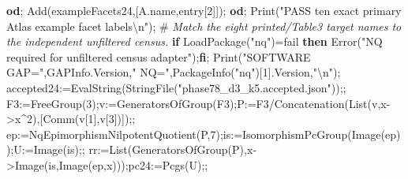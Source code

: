 \documentclass[
  10pt,
  letterpaper,
]{article}
\newenvironment{Shaded}{}{}
\newcommand{\BuiltInTok}[1]{\textcolor[rgb]{0.00,0.50,0.00}{#1}}
\newcommand{\CommentTok}[1]{\textcolor[rgb]{0.38,0.63,0.69}{\textit{#1}}}
\newcommand{\ConstantTok}[1]{\textcolor[rgb]{0.53,0.00,0.00}{#1}}
\newcommand{\ControlFlowTok}[1]{\textcolor[rgb]{0.00,0.44,0.13}{\textbf{#1}}}
\newcommand{\FloatTok}[1]{\textcolor[rgb]{0.25,0.63,0.44}{#1}}
\newcommand{\NormalTok}[1]{#1}
\newcommand{\OperatorTok}[1]{\textcolor[rgb]{0.40,0.40,0.40}{#1}}
\newcommand{\StringTok}[1]{\textcolor[rgb]{0.25,0.44,0.63}{#1}}
\newcommand{\VariableTok}[1]{\textcolor[rgb]{0.10,0.09,0.49}{#1}}
\begin{document}
\begin{Shaded}
\begin{Highlighting}[]
 \ControlFlowTok{od}\OperatorTok{;}
 \BuiltInTok{Add}\NormalTok{(}\VariableTok{exampleFacets24}\OperatorTok{,}\NormalTok{[}\VariableTok{A}\NormalTok{.}\VariableTok{name}\OperatorTok{,}\VariableTok{entry}\NormalTok{[}\FloatTok{2}\NormalTok{]])}\OperatorTok{;}
\ControlFlowTok{od}\OperatorTok{;}
\BuiltInTok{Print}\NormalTok{(}\StringTok{"PASS ten exact primary Atlas example facet labels\textbackslash{}n"}\NormalTok{)}\OperatorTok{;}
\NormalTok{\#}\CommentTok{ Match the eight printed/Table3 target names to the independent unfiltered census.}
\ControlFlowTok{if} \BuiltInTok{LoadPackage}\NormalTok{(}\StringTok{"nq"}\NormalTok{)}\OperatorTok{=}\ConstantTok{fail} \ControlFlowTok{then} \BuiltInTok{Error}\NormalTok{(}\StringTok{"NQ required for unfiltered census adapter"}\NormalTok{)}\OperatorTok{;}\ControlFlowTok{fi}\OperatorTok{;}
\BuiltInTok{Print}\NormalTok{(}\StringTok{"SOFTWARE GAP="}\OperatorTok{,}\BuiltInTok{GAPInfo}\NormalTok{.}\VariableTok{Version}\OperatorTok{,}\StringTok{" NQ="}\OperatorTok{,}\BuiltInTok{PackageInfo}\NormalTok{(}\StringTok{"nq"}\NormalTok{)[}\FloatTok{1}\NormalTok{].}\VariableTok{Version}\OperatorTok{,}\StringTok{"\textbackslash{}n"}\NormalTok{)}\OperatorTok{;}
\VariableTok{accepted24}\OperatorTok{:=}\BuiltInTok{EvalString}\NormalTok{(}\BuiltInTok{StringFile}\NormalTok{(}\StringTok{"phase78\_d3\_k5.accepted.json"}\NormalTok{))}\OperatorTok{;;}
\VariableTok{F3}\OperatorTok{:=}\BuiltInTok{FreeGroup}\NormalTok{(}\FloatTok{3}\NormalTok{)}\OperatorTok{;}\VariableTok{v}\OperatorTok{:=}\BuiltInTok{GeneratorsOfGroup}\NormalTok{(}\VariableTok{F3}\NormalTok{)}\OperatorTok{;}\VariableTok{P}\OperatorTok{:=}\VariableTok{F3}\OperatorTok{/}\BuiltInTok{Concatenation}\NormalTok{(}\BuiltInTok{List}\NormalTok{(}\VariableTok{v}\OperatorTok{,}\VariableTok{x}\OperatorTok{{-}\textgreater{}}\VariableTok{x}\OperatorTok{\^{}}\FloatTok{2}\NormalTok{)}\OperatorTok{,}\NormalTok{[}\BuiltInTok{Comm}\NormalTok{(}\VariableTok{v}\NormalTok{[}\FloatTok{1}\NormalTok{]}\OperatorTok{,}\VariableTok{v}\NormalTok{[}\FloatTok{3}\NormalTok{])])}\OperatorTok{;;}
\VariableTok{ep}\OperatorTok{:=}\VariableTok{NqEpimorphismNilpotentQuotient}\NormalTok{(}\VariableTok{P}\OperatorTok{,}\FloatTok{7}\NormalTok{)}\OperatorTok{;}\VariableTok{is}\OperatorTok{:=}\BuiltInTok{IsomorphismPcGroup}\NormalTok{(}\BuiltInTok{Image}\NormalTok{(}\VariableTok{ep}\NormalTok{))}\OperatorTok{;}\VariableTok{U}\OperatorTok{:=}\BuiltInTok{Image}\NormalTok{(}\VariableTok{is}\NormalTok{)}\OperatorTok{;;}
\VariableTok{rr}\OperatorTok{:=}\BuiltInTok{List}\NormalTok{(}\BuiltInTok{GeneratorsOfGroup}\NormalTok{(}\VariableTok{P}\NormalTok{)}\OperatorTok{,}\VariableTok{x}\OperatorTok{{-}\textgreater{}}\BuiltInTok{Image}\NormalTok{(}\VariableTok{is}\OperatorTok{,}\BuiltInTok{Image}\NormalTok{(}\VariableTok{ep}\OperatorTok{,}\VariableTok{x}\NormalTok{)))}\OperatorTok{;}\VariableTok{pc24}\OperatorTok{:=}\BuiltInTok{Pcgs}\NormalTok{(}\VariableTok{U}\NormalTok{)}\OperatorTok{;;}

\end{Highlighting}
\end{Shaded}
\end{document}
